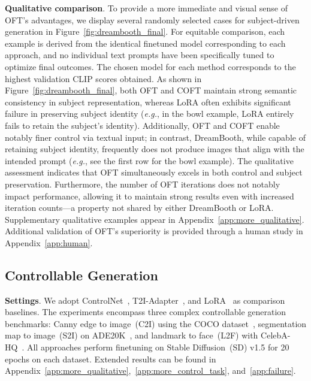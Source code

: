 \textbf{Qualitative comparison}. To provide a more immediate and visual sense of OFT’s advantages, we display several randomly selected cases for subject-driven generation in Figure~\ref{fig:dreambooth_final}. For equitable comparison, each example is derived from the identical finetuned model corresponding to each approach, and no individual text prompts have been specifically tuned to optimize final outcomes. The chosen model for each method corresponds to the highest validation CLIP scores obtained. As shown in Figure~\ref{fig:dreambooth_final}, both OFT and COFT maintain strong semantic consistency in subject representation, whereas LoRA often exhibits significant failure in preserving subject identity (\emph{e.g.}, in the bowl example, LoRA entirely fails to retain the subject’s identity). Additionally, OFT and COFT enable notably finer control via textual input; in contrast, DreamBooth, while capable of retaining subject identity, frequently does not produce images that align with the intended prompt (\emph{e.g.}, see the first row for the bowl example). The qualitative assessment indicates that OFT simultaneously excels in both control and subject preservation. Furthermore, the number of OFT iterations does not notably impact performance, allowing it to maintain strong results even with increased iteration counts—a property not shared by either DreamBooth or LoRA. Supplementary qualitative examples appear in Appendix~\ref{app:more_qualitative}. Additional validation of OFT’s superiority is provided through a human study in Appendix~\ref{app:human}.

\subsection{Controllable Generation}

\textbf{Settings}. We adopt ControlNet~\cite{zhang2023adding}, T2I-Adapter~\cite{mou2023t2i}, and LoRA~\cite{hulora2022} as comparison baselines. The experiments encompass three complex controllable generation benchmarks: Canny edge to image~(C2I) using the COCO dataset~\cite{lin2014microsoft}, segmentation map to image~(S2I) on ADE20K~\cite{zhou2017scene}, and landmark to face~(L2F) with CelebA-HQ~\cite{karras2018progressive,xia2021tedigan}. All approaches perform finetuning on Stable Diffusion~(SD) v1.5 for 20 epochs on each dataset. Extended results can be found in Appendix~\ref{app:more_qualitative},~\ref{app:more_control_task}, and~\ref{app:failure}.

